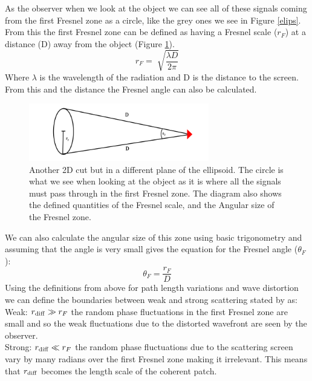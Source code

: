 \documentclass[10pt,a4paper]{article}
\begin{document}
As the observer when we look at the object we can see all of these signals coming from the first Fresnel zone as a circle, like the grey ones we see in Figure \ref{elips}. From this the first Fresnel zone can be defined as having a Fresnel scale ($r_F$) at a distance (D) away from the object (Figure \ref{circle}). 
\begin{equation}
r_F=\sqrt[]{\dfrac{\lambda D}{2\pi}}
\label{eq:rf}
\end{equation}
Where $\lambda$ is the wavelength of the radiation and D is the distance to the screen. From this and the distance the Fresnel angle can also be calculated.
\begin{figure}[H]
\centering 
\includegraphics[width=0.7\textwidth]{Fres_circle}
\caption{Another 2D cut but in a different plane of the ellipsoid. The circle is what we see when looking at the object as it is where all the signals must pass through in the first Fresnel zone. The diagram also shows the defined quantities of the Fresnel scale, and the Angular size of the Fresnel zone.}
\label{circle}
\end{figure}
We can also calculate the angular size of this zone using basic trigonometry and assuming that the angle is very small gives the equation for the Fresnel angle ($\theta_F$):
\begin{equation}
    \theta_F=\dfrac{r_F}{D}
    \label{eq:thetaf}
\end{equation}
Using the definitions from above for path length variations and wave distortion we can define the boundaries between weak and strong scattering stated by \citet{Narayan} as:\\

Weak: $r_{\ce{diff}} \gg r_{F}$ the random phase fluctuations in the first Fresnel zone are small and so the weak fluctuations due to the distorted wavefront are seen by the observer.\\

Strong: $r_{\ce{diff}} \ll r_{F}$ the random phase fluctuations due to the scattering screen vary by many radians over the first Fresnel zone making it irrelevant. This means that $r_{\ce{diff}}$ becomes the length scale of the coherent patch.\\
\end{document}
